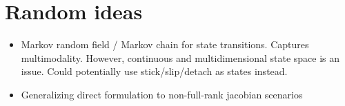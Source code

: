 \documentclass{article}
\begin{document}
\section{Random ideas}
\begin{itemize}
    \item Markov random field / Markov chain for state transitions. Captures multimodality. However, continuous and multidimensional state space is an issue. Could potentially use stick/slip/detach as states instead.
    \item Generalizing direct formulation to non-full-rank jacobian scenarios
\end{itemize}
\end{document}

